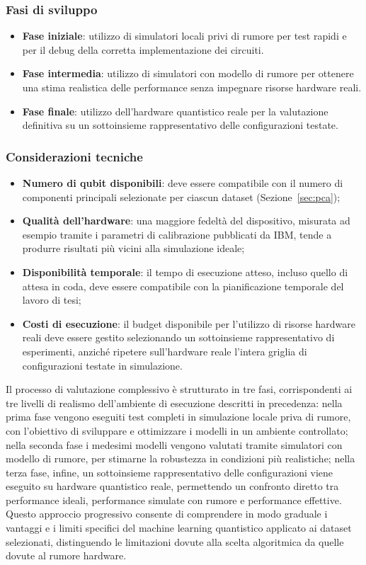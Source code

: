 \subsubsection{Fasi di sviluppo}
\begin{itemize}
    \item \textbf{Fase iniziale}: utilizzo di simulatori locali privi di rumore per test rapidi e per il debug della corretta implementazione dei circuiti.
    \item \textbf{Fase intermedia}: utilizzo di simulatori con modello di rumore per ottenere una stima realistica delle performance senza impegnare risorse hardware reali.
    \item \textbf{Fase finale}: utilizzo dell'hardware quantistico reale per la valutazione definitiva su un sottoinsieme rappresentativo delle configurazioni testate.
\end{itemize}

\subsubsection{Considerazioni tecniche}
\begin{itemize}
    \item \textbf{Numero di qubit disponibili}: deve essere compatibile con il numero di componenti principali selezionate per ciascun dataset (Sezione~\ref{sec:pca});
    \item \textbf{Qualità dell'hardware}: una maggiore fedeltà del dispositivo, misurata ad esempio tramite i parametri di calibrazione pubblicati da IBM, tende a produrre risultati più vicini alla simulazione ideale;
    \item \textbf{Disponibilità temporale}: il tempo di esecuzione atteso, incluso quello di attesa in coda, deve essere compatibile con la pianificazione temporale del lavoro di tesi;
    \item \textbf{Costi di esecuzione}: il budget disponibile per l'utilizzo di risorse hardware reali deve essere gestito selezionando un sottoinsieme rappresentativo di esperimenti, anziché ripetere sull'hardware reale l'intera griglia di configurazioni testate in simulazione.
\end{itemize}

Il processo di valutazione complessivo è strutturato in tre fasi, corrispondenti ai tre livelli di realismo dell'ambiente di esecuzione descritti in precedenza: nella prima fase vengono eseguiti test completi in simulazione locale priva di rumore, con l'obiettivo di sviluppare e ottimizzare i modelli in un ambiente controllato; nella seconda fase i medesimi modelli vengono valutati tramite simulatori con modello di rumore, per stimarne la robustezza in condizioni più realistiche; nella terza fase, infine, un sottoinsieme rappresentativo delle configurazioni viene eseguito su hardware quantistico reale, permettendo un confronto diretto tra performance ideali, performance simulate con rumore e performance effettive. Questo approccio progressivo consente di comprendere in modo graduale i vantaggi e i limiti specifici del machine learning quantistico applicato ai dataset selezionati, distinguendo le limitazioni dovute alla scelta algoritmica da quelle dovute al rumore hardware.

